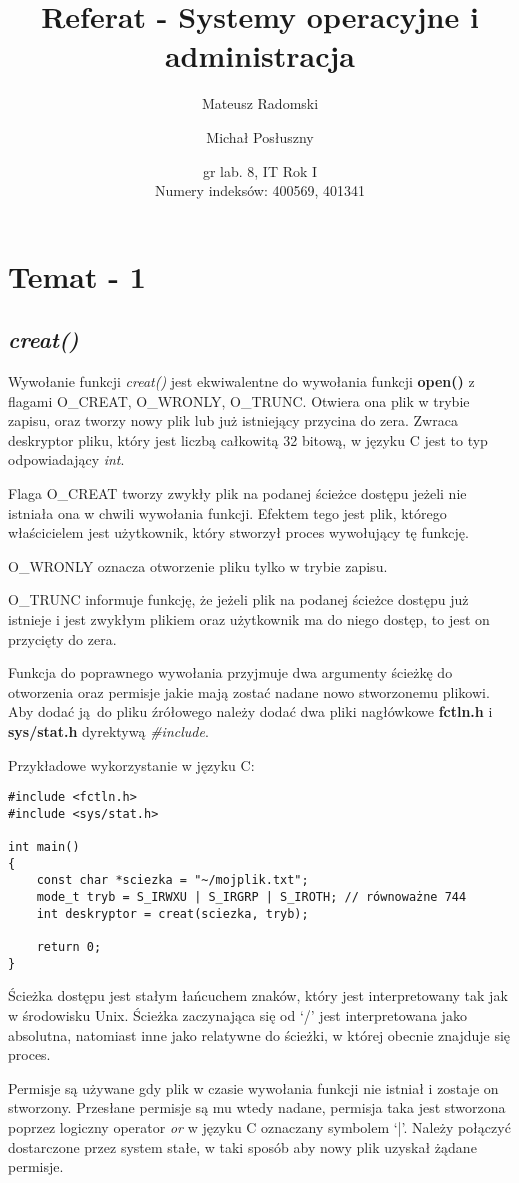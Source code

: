 \documentclass{article}
\title{Referat - Systemy operacyjne i administracja}
\author{Mateusz Radomski \and Michał Posłuszny}
\date{gr lab. 8, IT Rok I \\ Numery indeksów: 400569, 401341 }
\begin{document}
\maketitle
\section{Temat - 1}
\subsection{\textit{creat()}}
Wywołanie funkcji \textit{creat()} jest ekwiwalentne do wywołania funkcji \textbf{open()} z flagami O\_CREAT, O\_WRONLY, O\_TRUNC.
Otwiera ona plik w trybie zapisu, oraz tworzy nowy plik lub już istniejący przycina do zera.
Zwraca deskryptor pliku, który jest liczbą całkowitą 32 bitową, w języku C jest to typ odpowiadający \textit{int}.

Flaga O\_CREAT tworzy zwykły plik na podanej ścieżce dostępu jeżeli nie istniała ona w chwili wywołania funkcji. Efektem tego jest plik, którego właścicielem jest użytkownik, który stworzył proces wywołujący tę funkcję.

O\_WRONLY oznacza otworzenie pliku tylko w trybie zapisu.

O\_TRUNC informuje funkcję, że jeżeli plik na podanej ścieżce dostępu już istnieje i jest zwykłym plikiem oraz użytkownik ma do niego dostęp, to jest on przycięty do zera.

Funkcja do poprawnego wywołania przyjmuje dwa argumenty ścieżkę do otworzenia oraz permisje jakie mają zostać nadane nowo stworzonemu plikowi.
Aby dodać ją do pliku źrółowego należy dodać dwa pliki nagłówkowe \textbf{fctln.h} i \textbf{sys/stat.h} dyrektywą \textit{\#include}.

Przykładowe wykorzystanie w języku C:
\begin{verbatim}
#include <fctln.h>
#include <sys/stat.h>

int main()
{
	const char *sciezka = "~/mojplik.txt";
	mode_t tryb = S_IRWXU | S_IRGRP | S_IROTH; // równoważne 744
	int deskryptor = creat(sciezka, tryb);

	return 0;
}
\end{verbatim}

Ścieżka dostępu jest stałym łańcuchem znaków, który jest interpretowany tak jak w środowisku Unix.
Ścieżka zaczynająca się od `/' jest interpretowana jako absolutna, natomiast inne jako relatywne do
ścieżki, w której obecnie znajduje się proces.

Permisje są używane gdy plik w czasie wywołania funkcji nie istniał i zostaje on stworzony.
Przesłane permisje są mu wtedy nadane, permisja taka jest stworzona poprzez logiczny operator
\textit{or} w języku C oznaczany symbolem `|'. Należy połączyć dostarczone przez system stałe,
w taki sposób aby nowy plik uzyskał żądane permisje.
\end{document}
